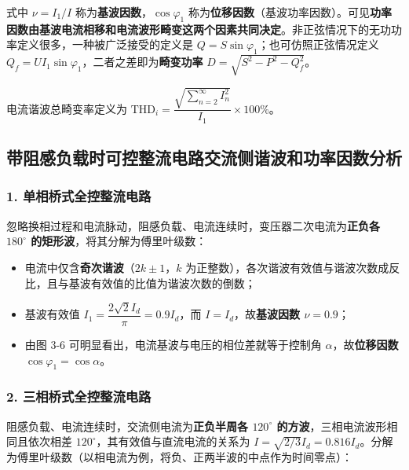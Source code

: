 
式中 $\nu=I_1/I$ 称为\textbf{基波因数}，$\cos\varphi_1$ 称为\textbf{位移因数}（基波功率因数）。可见\textbf{功率因数由基波电流相移和电流波形畸变这两个因素共同决定}。非正弦情况下的无功功率定义很多，一种被广泛接受的定义是 $Q=S\sin\varphi_1$；也可仿照正弦情况定义 $Q_f=UI_1\sin\varphi_1$，二者之差即为\textbf{畸变功率} $D=\sqrt{S^2-P^2-Q_f^2}$。

电流谐波总畸变率定义为 $\mathrm{THD}_i=\dfrac{\sqrt{\sum_{n=2}^{\infty}I_n^2}}{I_1}\times100\%$。

\subsection{带阻感负载时可控整流电路交流侧谐波和功率因数分析}

\subsubsection*{1. 单相桥式全控整流电路}

忽略换相过程和电流脉动，阻感负载、电流连续时，变压器二次电流为\textbf{正负各 $180^\circ$ 的矩形波}，将其分解为傅里叶级数：


\begin{itemize}
  \item 电流中仅含\textbf{奇次谐波}（$2k\pm1$，$k$ 为正整数），各次谐波有效值与谐波次数成反比，且与基波有效值的比值为谐波次数的倒数；
  \item 基波有效值 $I_1=\dfrac{2\sqrt{2}I_d}{\pi}=0.9I_d$，而 $I=I_d$，故\textbf{基波因数 $\nu=0.9$}；
  \item 由图 3-6 可明显看出，电流基波与电压的相位差就等于控制角 $\alpha$，故\textbf{位移因数 $\cos\varphi_1=\cos\alpha$}。
\end{itemize}


\subsubsection*{2. 三相桥式全控整流电路}

阻感负载、电流连续时，交流侧电流为\textbf{正负半周各 $120^\circ$ 的方波}，三相电流波形相同且依次相差 $120^\circ$，其有效值与直流电流的关系为 $I=\sqrt{2/3}I_d=0.816I_d$。分解为傅里叶级数（以相电流为例，将负、正两半波的中点作为时间零点）：

